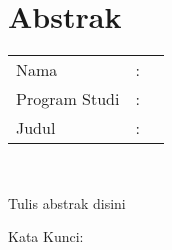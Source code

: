 %
%
%

\chapter*{Abstrak}

\vspace*{0.2cm}

\noindent \begin{tabular}{l l p{10cm}}
	Nama&: & \penulis \\
	Program Studi&: & \programstudi \\
	Judul&: & \judul \\
\end{tabular} \\ 

\vspace*{0.5cm}

\noindent
Tulis abstrak disini


\vspace*{0.2cm}

\noindent Kata Kunci: \\ 
\noindent {} \\

\newpage